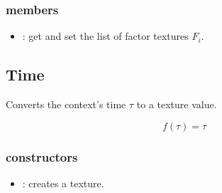 \subsubsection*{members}
\begin{itemize}
	\item {}:
		get and set the list of factor textures $F_i$.
\end{itemize}


 
\subsection{Time}

Converts the context's time $\tau$ to a texture value.

\begin{equation}
	f\left(\tau\right) = \tau
\end{equation}

\subsubsection*{constructors}
\begin{itemize}
	\item {}:
		creates a  texture.
\end{itemize}

